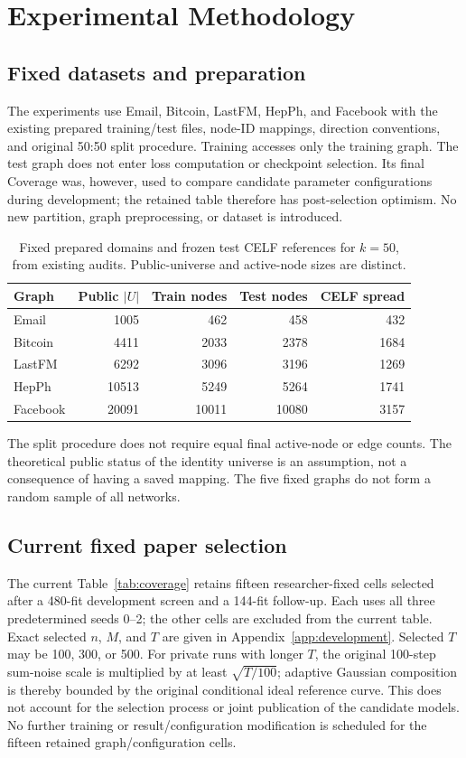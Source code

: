 \chapter{Experimental Methodology}\label{ch:design}
\section{Fixed datasets and preparation}
The experiments use Email, Bitcoin, LastFM, HepPh, and Facebook with the existing prepared training/test files, node-ID mappings, direction conventions, and original 50:50 split procedure. Training accesses only the training graph. The test graph does not enter loss computation or checkpoint selection. Its final Coverage was, however, used to compare candidate parameter configurations during development; the retained table therefore has post-selection optimism. No new partition, graph preprocessing, or dataset is introduced.

\begin{table}[htbp]
\centering\small
\caption{Fixed prepared domains and frozen test CELF references for $k=50$, from existing audits. Public-universe and active-node sizes are distinct.}\label{tab:datasets}
\begin{tabular}{lrrrr}\toprule
Graph & Public $|U|$ & Train nodes & Test nodes & CELF spread\\\midrule
Email & 1005 & 462 & 458 & 432\\
Bitcoin & 4411 & 2033 & 2378 & 1684\\
LastFM & 6292 & 3096 & 3196 & 1269\\
HepPh & 10513 & 5249 & 5264 & 1741\\
Facebook & 20091 & 10011 & 10080 & 3157\\\bottomrule
\end{tabular}
\end{table}

The split procedure does not require equal final active-node or edge counts. The theoretical public status of the identity universe is an assumption, not a consequence of having a saved mapping. The five fixed graphs do not form a random sample of all networks.

\section{Current fixed paper selection}
The current Table~\ref{tab:coverage} retains fifteen researcher-fixed cells selected after a 480-fit development screen and a 144-fit follow-up. Each uses all three predetermined seeds 0--2; the other cells are excluded from the current table. Exact selected $n$, $M$, and $T$ are given in Appendix~\ref{app:development}. Selected $T$ may be 100, 300, or 500. For private runs with longer $T$, the original 100-step sum-noise scale is multiplied by at least $\sqrt{T/100}$; adaptive Gaussian composition is thereby bounded by the original conditional ideal reference curve. This does not account for the selection process or joint publication of the candidate models. No further training or result/configuration modification is scheduled for the fifteen retained graph/configuration cells.


